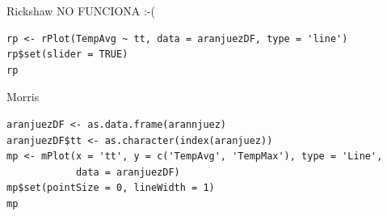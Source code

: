 \documentclass[xcolor={usenames,svgnames,dvipsnames}]{beamer}
\begin{document}
\begin{frame}[fragile,label=sec-5-1-3]{Rickshaw}
 NO FUNCIONA :-(
\lstset{language=R,label= ,caption= ,numbers=none}
\begin{lstlisting}
rp <- rPlot(TempAvg ~ tt, data = aranjuezDF, type = 'line')
rp$set(slider = TRUE)
rp
\end{lstlisting}
\end{frame}


\begin{frame}[fragile,label=sec-5-1-4]{Morris}
 \lstset{language=R,label= ,caption= ,numbers=none}
\begin{lstlisting}
aranjuezDF <- as.data.frame(arannjuez)
aranjuezDF$tt <- as.character(index(aranjuez))
mp <- mPlot(x = 'tt', y = c('TempAvg', 'TempMax'), type = 'Line',
            data = aranjuezDF)
mp$set(pointSize = 0, lineWidth = 1)
mp
\end{lstlisting}
\end{frame}

\begin{frame}[label=sec-5-1-5]{}

\end{frame}
\end{document}
